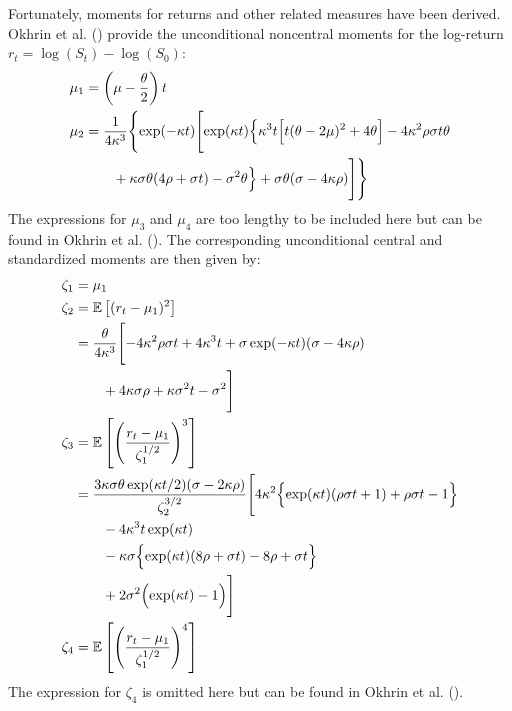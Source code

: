 Fortunately, moments for returns and other related measures have been derived. Okhrin et al. (\citeyear{okhrinSimulatingCoxIngersoll2022}) provide the unconditional noncentral moments for the log-return $r_t = \log(S_t) - \log(S_0)$:
\begin{align}
    \mu_1 &= \left(\mu - \frac{\theta}{2}\right)t \notag \\
    \mu_2 &= \frac{1}{4\kappa^3}\Biggl\{
        \exp(-\kappa t)\Biggl[
            \exp(\kappa t)\Bigl\{
                \kappa^3 t\Bigl[t(\theta-2\mu)^2 + 4\theta\Bigr] 
                - 4\kappa^2\rho\sigma t\theta \notag \\
            &\quad\quad + \kappa\sigma\theta(4\rho + \sigma t)
                - \sigma^2\theta
            \Bigr\} + \sigma\theta(\sigma-4\kappa\rho)
        \Biggr]
    \Biggr\} \notag
\end{align}
The expressions for $\mu_3$ and $\mu_4$ are too lengthy to be included here but can be found in Okhrin et al. (\citeyear{okhrinSimulatingCoxIngersoll2022}). The corresponding unconditional central and standardized moments are then given by:
\begin{align}
    \zeta_1 &= \mu_1 \notag \\
    \zeta_2 &= \mathbb{E}\left[(r_t-\mu_1)^2\right] \notag \\
    &=\frac{\theta}{4\kappa^3}\Biggl[
        -4\kappa^2\rho\sigma t + 4\kappa^3 t + \sigma\exp(-\kappa t)(\sigma - 4\kappa\rho) \notag\\
    &\quad\quad + 4\kappa\sigma\rho + \kappa\sigma^2 t - \sigma^2
    \Biggr] \notag \\
    \zeta_3 &= \mathbb{E}\left[\left(\frac{r_t-\mu_1}{\zeta_1^{1/2}}\right)^3\right] \notag \\
    &=\frac{3\kappa\sigma\theta\exp(\kappa t/2)(\sigma - 2\kappa\rho)}{\zeta_2^{3/2}}
    \Biggl[
        4\kappa^2\Bigl\{\exp(\kappa t)(\rho\sigma t+1) + \rho\sigma t - 1\Bigr\} \notag\\
    &\quad\quad - 4\kappa^3 t\exp(\kappa t) \notag\\
    &\quad\quad - \kappa\sigma\Bigl\{\exp(\kappa t)(8\rho + \sigma t) - 8\rho + \sigma t\Bigr\} \notag\\
    &\quad\quad + 2\sigma^2\Bigl(\exp(\kappa t)-1\Bigr)
    \Biggr] \notag \\
    \zeta_4 &= \mathbb{E}\left[\left(\frac{r_t-\mu_1}{\zeta_1^{1/2}}\right)^4\right] \notag
\end{align}
The expression for $\zeta_4$ is omitted here but can be found in Okhrin et al. (\citeyear{okhrinSimulatingCoxIngersoll2022}).

